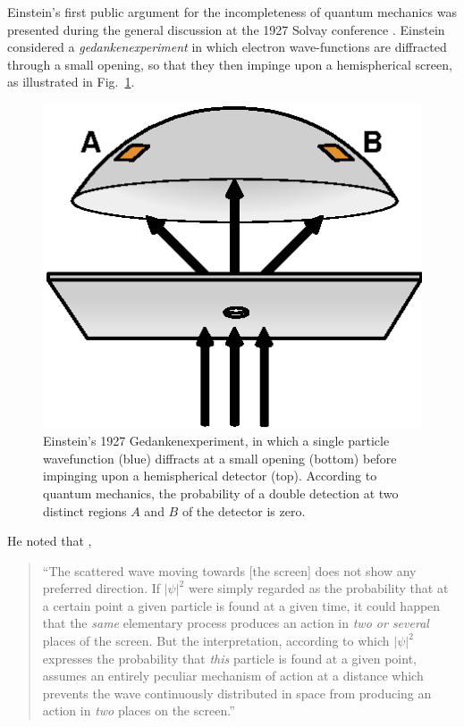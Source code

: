 \documentclass[aps,nofootinbib,12pt]{revtex4}
\begin{document}
Einstein's first public argument for the incompleteness of quantum
mechanics was presented during the general discussion at the 1927
Solvay conference \cite{bac_valentini}. Einstein considered a
\textit{gedankenexperiment} in which electron wave-functions are
diffracted through a small opening, so that they then impinge upon a
hemispherical screen, as illustrated in Fig.~\ref{FIG:hemisphere}.
\begin{figure}[t]
\includegraphics[scale=0.8]{hemisphere}
\caption{Einstein's 1927 Gedankenexperiment, in which a single
particle wavefunction (blue) diffracts at a small opening (bottom)
before impinging upon a hemispherical detector (top). According to
quantum mechanics, the probability of a double detection at two
distinct regions $A$ and $B$ of the detector is zero.}
\label{FIG:hemisphere}
\end{figure}
He noted that \cite{E1927},
\begin{quote}
\textquotedblleft The scattered wave moving towards [the screen]
does not show any preferred direction. If $|\psi|^{2}$ were simply
regarded as the probability that at a certain point a given particle
is found at a given time, it could happen that the \textit{same}
elementary process produces an action in \textit{two or several}
places of the screen. But the interpretation, according to which
$|\psi|^{2}$ expresses the probability that \textit{this} particle
is found at a given point, assumes an entirely peculiar mechanism of
action at a distance which prevents the wave continuously
distributed in space from producing an action in \textit{two} places
on the screen.\textquotedblright
\end{quote}
\end{document}
